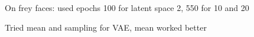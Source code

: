 \documentclass[../report.tex]{subfiles}
\begin{document}
On frey faces: used epochs 100 for latent space 2, 550 for 10 and 20

Tried mean and sampling for VAE, mean worked better
\end{document}
